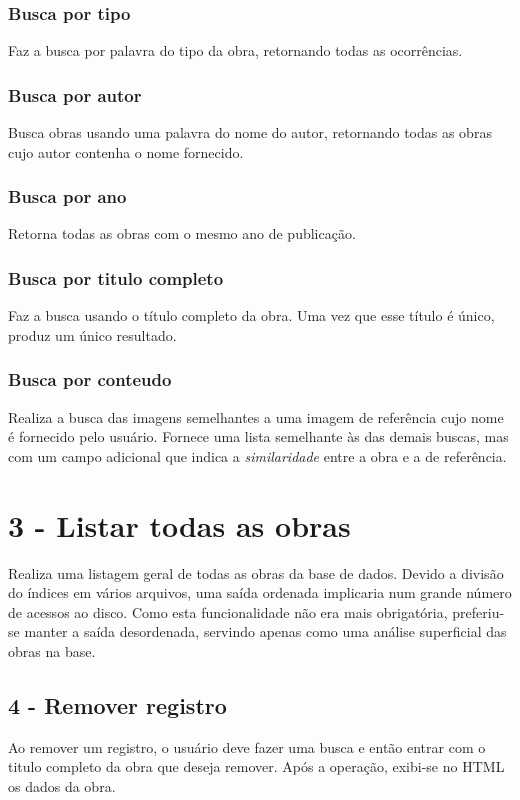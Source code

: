 \subsubsection{Busca por tipo}
Faz a busca por palavra do tipo da obra, retornando todas as ocorrências.

\subsubsection{Busca por autor}
Busca obras usando uma palavra do nome do autor, retornando todas as obras cujo autor contenha o nome fornecido.

\subsubsection{Busca por ano}
Retorna todas as obras com o mesmo ano de publicação.

\subsubsection{Busca por titulo completo}
Faz a busca usando o título completo da obra. Uma vez que esse título é único, produz um único resultado.

\subsubsection{Busca por conteudo}
Realiza a busca das imagens semelhantes a uma imagem de referência cujo nome é fornecido pelo usuário. Fornece uma lista semelhante às das demais buscas, mas com um campo adicional que indica a \textit{similaridade} entre a obra e a de referência.

\section{3 - Listar todas as obras}
Realiza uma listagem geral de todas as obras da base de dados. Devido a divisão do índices em vários arquivos, uma saída ordenada implicaria num grande número de acessos ao disco. Como esta funcionalidade não era mais obrigatória, preferiu-se manter a saída desordenada, servindo apenas como uma análise superficial das obras na base.

\subsection{4 - Remover registro}
Ao remover um registro, o usuário deve fazer uma busca e então entrar com o titulo completo da obra que deseja remover. Após a operação, exibi-se no HTML os dados da obra.

